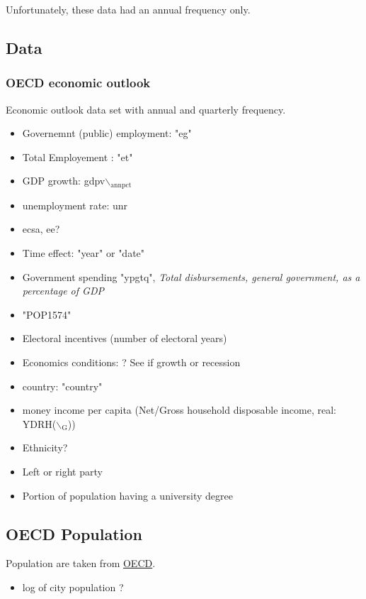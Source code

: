 \documentclass[a4paper]{article}
\begin{document}
Unfortunately, these data had an annual frequency only.

\subsection{Data}
\label{sec-2-1}

\subsubsection{OECD economic outlook}
\label{sec-2-1-1}

Economic outlook data set with annual and quarterly frequency.

\begin{itemize}
\item Governemnt (public) employment: "eg"
\item Total Employement : "et"
\item GDP growth: gdpv$\backslash$$_{\text{annpct}}$
\item unemployment rate: unr
\item ecsa, ee?
\item Time effect: "year" or "date"
\item Government spending "ypgtq", \emph{Total disbursements, general
government, as a percentage of GDP}

\item "POP1574"
\item Electoral incentives (number of electoral years)
\item Economics conditions: ? See if growth or recession
\item country: "country"
\item money income per capita (Net/Gross household disposable income, real:
YDRH($\backslash$$_{\text{G}}$))

\item Ethnicity?
\item Left or right party
\item Portion of population having a university degree
\end{itemize}

\subsection{OECD Population}
\label{sec-2-2}

Population are taken from
\href{http://stats.oecd.org/Index.aspx?DatasetCode=POP_FIVE_HIST}{OECD}.

\begin{itemize}
\item log of city population ?
\end{itemize}
\end{document}
